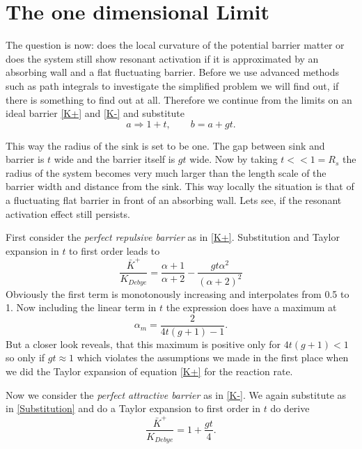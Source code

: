 \section{The one dimensional Limit}
The question is now: does the local curvature of the potential barrier matter or does the system still show resonant activation if it is approximated by an absorbing wall and a flat fluctuating barrier.
Before we use advanced methods such as path integrals to investigate the simplified problem we will find out, if there is something to find out at all.
Therefore we continue from the limits on an ideal barrier \eqref{K+} and \eqref{K-} and substitute
\begin{equation}
    a \Rightarrow 1+t, \qquad b = a + gt.
    \label{Substitution}
\end{equation}
\par
This way the radius of the sink is set to be one. The gap between sink and barrier is $t$ wide and the barrier itself is $gt$ wide. Now by taking $t<<1=R_s$ the radius of the system becomes very much larger than the length scale of the barrier width and distance from the sink. This way locally the situation is that of a fluctuating flat barrier in front of an absorbing wall. Lets see, if the resonant activation effect still persists.
\par
First consider the \textit{perfect repulsive barrier} as in \eqref{K+}. Substitution and Taylor expansion in $t$ to first order leads to
\begin{equation}
    \frac{\bar{K}^{+}}{K_{Debye}} = \frac{\alpha+1}{\alpha+2}-\frac{g t \alpha^2}{(\alpha+2)^2} 
    \label{K+linear}
\end{equation}
Obviously the first term is monotonously increasing and interpolates from 0.5 to 1. Now including the linear term in $t$ the expression does have a maximum at
\begin{equation}
    \alpha_m = \frac{2}{4t(g+1) - 1}.
    \label{alpham+}
\end{equation}
But a closer look reveals, that this maximum is positive only for $4t(g+1) < 1$ so only if $gt \approx 1$ which violates the assumptions we made in the first place when we did the Taylor expansion of equation \eqref{K+} for the reaction rate. 
\par
Now we consider the \textit{perfect attractive barrier} as in \eqref{K-}. We again substitute as in \eqref{Substitution} and do a Taylor expansion to first order in $t$ do derive
\begin{equation}
    \frac{\bar{K}^{+}}{K_{Debye}} = 1+\frac{g t}{4}.
    \label{K-linear}
\end{equation}
